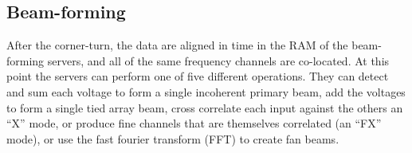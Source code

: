 \subsection{Beam-forming}

After the corner-turn, the data are aligned in time in the RAM of the beam-forming servers, and all of the same frequency channels are co-located. At this point the servers can perform one of five different operations. They can detect and sum each voltage to form a single incoherent primary beam, add the voltages to form a single tied array beam, cross correlate each input against the others an ``X'' mode, or produce fine channels that are themselves correlated (an ``FX'' mode), or use the fast fourier transform (FFT) to create fan beams.